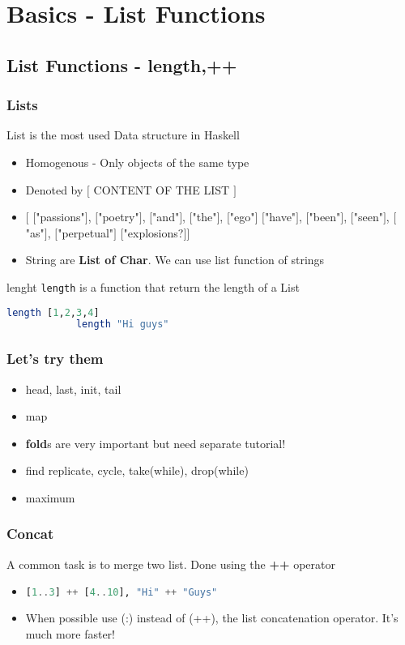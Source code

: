 \section{Basics - List Functions}
\frame{\sectionpage}

\subsection{List Functions - length,++ }
	\begin{frame}[fragile]\frametitle{Lists}
		List is the most used Data structure in Haskell
		\begin{itemize}
		\item Homogenous - Only objects of the same type
		\item Denoted by $[$ CONTENT OF THE LIST $]$
		\item $[$ $[$"passions"$]$, $[$"poetry"$]$, $[$"and"$]$, $[$"the"$]$,
		$[$"ego"$]$ $[$"have"$]$, $[$"been"$]$, $[$"seen"$]$, $[$"as"$]$, $[$"perpetual"$]$
		$[$"explosions?$]$$]$
		\item String are \textbf{List of Char}. We can use list function of
		strings
		\end{itemize}
		\begin{exampleblock}{lenght}
		\texttt{length} is a function that return the length of a List
		 \begin{lstlisting}[language=Haskell,basicstyle=\footnotesize\ttfamily]
			length [1,2,3,4]
			length "Hi guys" 
		\end{lstlisting}
		\end{exampleblock}
	\end{frame}
	
	\begin{frame}[fragile]\frametitle{Let's try them}
		\begin{itemize}
		  \item head, last, init, tail
		  \item map
		  \item \textbf{fold}s are very important but need separate tutorial!
		  \item find
		  replicate, cycle, take(while), drop(while) 
		  \item maximum 
			\end{itemize}
			
		
	\end{frame}
	
		
	\begin{frame}[fragile]\frametitle{Concat}
		A common task is to merge two list. Done using the \textbf{++} operator
		\begin{itemize}
		  \item 
		  \begin{lstlisting}[language=Haskell,basicstyle=\footnotesize\ttfamily]
			[1..3] ++ [4..10], "Hi" ++ "Guys"
		\end{lstlisting}
		\item When possible use (:) instead of (++), the list concatenation operator.
		It's much more faster!
		\end{itemize}
		
	\end{frame}
	